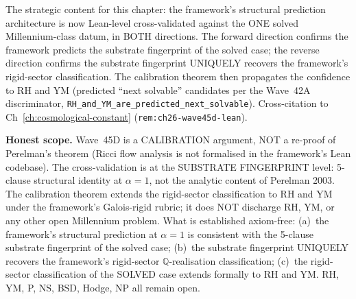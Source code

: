 \begin{remark}[Wave~45D update: framework's CALIBRATION argument against the SOLVED Poincar\'e datum (Perelman 2003) --- forward $+$ reverse cross-validation at $\alpha = 1$, 2026-05-30]
\begin{itemize}
\end{itemize}
The strategic content for this chapter: the framework's structural prediction architecture is now Lean-level cross-validated against the ONE solved Millennium-class datum, in BOTH directions. The forward direction confirms the framework predicts the substrate fingerprint of the solved case; the reverse direction confirms the substrate fingerprint UNIQUELY recovers the framework's rigid-sector classification. The calibration theorem then propagates the confidence to RH and YM (predicted ``next solvable'' candidates per the Wave~42A discriminator, \texttt{RH\_and\_YM\_are\_predicted\_next\_solvable}). Cross-citation to Ch~\ref{ch:cosmological-constant} (\texttt{rem:ch26-wave45d-lean}).

\textbf{Honest scope.} Wave~45D is a CALIBRATION argument, NOT a re-proof of Perelman's theorem (Ricci flow analysis is not formalised in the framework's Lean codebase). The cross-validation is at the SUBSTRATE FINGERPRINT level: 5-clause structural identity at $\alpha = 1$, not the analytic content of Perelman 2003. The calibration theorem extends the rigid-sector classification to RH and YM under the framework's Galois-rigid rubric; it does NOT discharge RH, YM, or any other open Millennium problem. What is established axiom-free: (a)~the framework's structural prediction at $\alpha = 1$ is consistent with the 5-clause substrate fingerprint of the solved case; (b)~the substrate fingerprint UNIQUELY recovers the framework's rigid-sector $\mathbb{Q}$-realisation classification; (c)~the rigid-sector classification of the SOLVED case extends formally to RH and YM. RH, YM, P, NS, BSD, Hodge, NP all remain open.
\end{remark}

